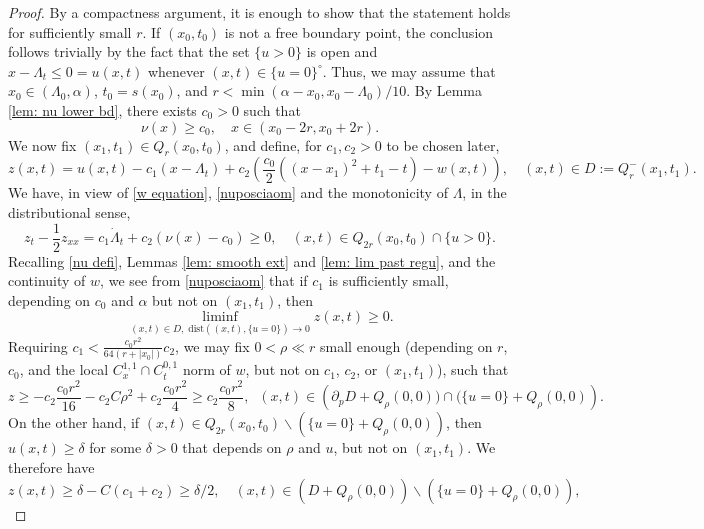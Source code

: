 \documentclass{article}
\numberwithin{equation}{section}
\numberwithin{figure}{section}
\theoremstyle{plain}
\theoremstyle{plain}
\theoremstyle{plain}
\theoremstyle{plain}
\theoremstyle{definition}
\theoremstyle{remark}
\begin{document}
\begin{proof} By a compactness argument, it is enough to show that the statement holds for sufficiently small $r$. If $(x_0,t_0)$ is not a free boundary point, the conclusion follows trivially by the fact that the set $\{u>0\}$ is open and $x-\Lambda_t\leq0= u(x,t)$ whenever $(x,t)\in \{u=0\}^{\circ}$. Thus, we may assume that $x_0\in (\Lambda_0,\alpha)$, $t_0=s(x_0)$, and $r<\min(\alpha-x_0,x_0-\Lambda_0)/10$. By Lemma \ref{lem: nu lower bd}, there exists $c_0>0$ such that
\begin{equation} \label{nuposciaom}
    \nu(x)\geq c_0, \quad x\in (x_0-2r,x_0+2r).
\end{equation}
We now fix $(x_1,t_1)\in Q_{r}(x_0,t_0)$, and define, for $c_1, c_2>0$ to be chosen later,
\[ z(x,t)=u(x,t)-c_1(x-\Lambda_t) +c_2\left(\frac{c_0}{2}((x-x_1)^2+t_1-t)-w(x,t)\right), \quad (x,t)\in D:=Q_r^-(x_1,t_1).\]
We have, in view of \eqref{w equation}, \eqref{nuposciaom} and the monotonicity of $\Lambda$, in the distributional sense,
\begin{equation} \label{zcladorci} z_t-\frac12z_{xx}=c_1\dot \Lambda_t+c_2(\nu(x)-c_0)\geq 0, \quad (x,t)\in Q_{2r}(x_0,t_0)\cap\{u>0\}.\end{equation}
Recalling \eqref{nu defi}, Lemmas \ref{lem: smooth ext} and \ref{lem: lim past regu}, and the continuity of $w$, we see from \eqref{nuposciaom} that if $c_1$ is sufficiently small, depending on $c_0$ and $\alpha$ but not on $(x_1,t_1)$, then
\begin{equation}\label{partk1o1}
    \liminf_{(x,t)\in D,\; \text{dist}((x,t),\{u=0\})\to0}z(x,t) \geq 0.
\end{equation}
Requiring $c_ 1<\frac{c_0r^2}{64(r+|x_0|)}c_2$, we may fix $0<\rho \ll r$ small enough (depending on $r$, $c_0$, and the local $C^{1,1}_x\cap C^{0,1}_t$ norm of $w$, but not on $c_1$, $c_2$, or $(x_1,t_1)$), such that
\begin{equation} \label{partk1o2}z\geq -c_2\frac{c_0r^2}{16}-c_2C\rho^2 +c_2\frac{c_0r^2}{4}\geq c_2\frac{c_0r^2}{8}, \;\; (x,t)\in\left(\partial_{p} D+Q_{\rho}(0,0))\cap(\{u=0\}+Q_{\rho}(0,0)\right).\end{equation}
On the other hand, if $(x,t)\in Q_{2r}(x_0,t_0)\backslash(\{u=0\}+Q_{\rho}(0,0))$, then $u(x,t) \geq \delta$ for some $\delta>0$ that depends on $\rho$ and $u$, but not on $(x_1,t_1)$. We therefore have
\begin{equation}\label{partk1o3}
    z(x,t)\geq \delta -C(c_1+c_2)\geq \delta/2, \quad (x,t)\in (D+Q_{\rho}(0,0))\backslash(\{u=0\}+Q_{\rho}(0,0)),

\end{equation}
\end{proof}
\end{document}
